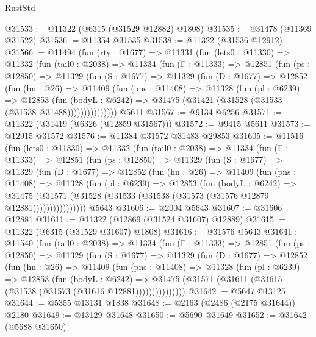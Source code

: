 \begin{lexlean}{RustStd}
\begin{coremodule}
@31533 := @11322 (@6315 (@31529 @12882) @1808)
@31535 := @31478 (@11369 @31522)
@31536 := @11354 @31535
@31538 := @11322 (@31536 @12912)
@31566 := @11494
    (fun (rty : @1677) =>
    @11331
      (fun (lets0 : @11330) =>
      @11332
        (fun (tail0 : @2038) =>
        @11334
          (fun (Γ : @11333) =>
          @12851
            (fun (ps : @12850) =>
            @11329
              (fun (S : @1677) =>
              @11329
                (fun (D : @1677) =>
                @12852
                  (fun (hn : @26) =>
                  @11409
                    (fun (pns : @11408) =>
                    @11328
                      (fun (pl : @6239) =>
                      @12853
                        (fun (bodyL : @6242) =>
                        @31475 (@31421 (@31528 (@31533 (@31538 @31488)))))))))))))))
    @5611
@31567 := @9134 @6256
@31571 := @11322 (@31419 (@6326 (@12859 @31567)))
@31572 := @9415 @5611
@31573 := @12915 @31572
@31576 := @11384 @31572 @31483 @29853
@31605 := @11516
    (fun (lets0 : @11330) =>
    @11332
      (fun (tail0 : @2038) =>
      @11334
        (fun (Γ : @11333) =>
        @12851
          (fun (ps : @12850) =>
          @11329
            (fun (S : @1677) =>
            @11329
              (fun (D : @1677) =>
              @12852
                (fun (hn : @26) =>
                @11409
                  (fun (pns : @11408) =>
                  @11328
                    (fun (pl : @6239) =>
                    @12853
                      (fun (bodyL : @6242) =>
                      @31475
                        (@31571
                          (@31528 (@31533 (@31538 (@31573 (@31576 @12879 @12881))))))))))))))))
    @5643
@31606 := @2004 @5643
@31607 := @31606 @12881
@31611 := @11322 (@12869 (@31524 @31607) @12889)
@31615 := @11322 (@6315 (@31529 @31607) @1808)
@31616 := @31576 @5643
@31641 := @11540
    (fun (tail0 : @2038) =>
    @11334
      (fun (Γ : @11333) =>
      @12851
        (fun (ps : @12850) =>
        @11329
          (fun (S : @1677) =>
          @11329
            (fun (D : @1677) =>
            @12852
              (fun (hn : @26) =>
              @11409
                (fun (pns : @11408) =>
                @11328
                  (fun (pl : @6239) =>
                  @12853
                    (fun (bodyL : @6242) =>
                    @31475 (@31571 (@31611 (@31615 (@31538 (@31573 (@31616 @12881)))))))))))))))
@31642 := @5647 @13125
@31644 := @5355 @13131 @1838
@31648 := @2163 (@2486 (@2175 @31644)) @2180
@31649 := @13129 @31648
@31650 := @5690 @31649
@31652 := @31642 (@5688 @31650)

\end{coremodule}
\end{lexlean}
